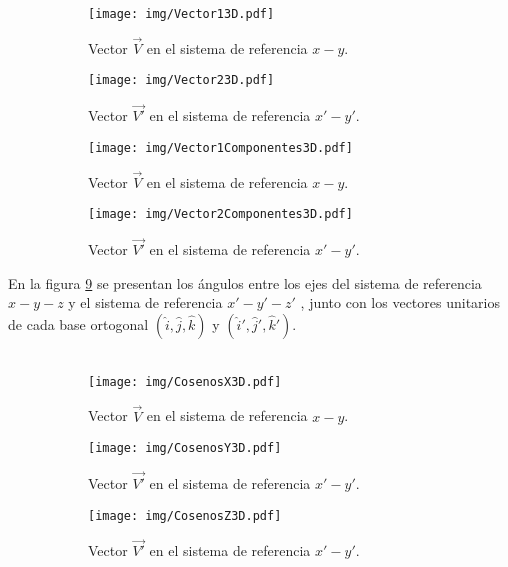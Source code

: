 \documentclass[12pt,letterpaper, twoside, openany]{article}
\begin{document}
\begin{figure}[H]
	\centering
	\begin{subfigure}[l]{0.450\textwidth}
		\texttt{[image: img/Vector13D.pdf]}
		\caption{Vector $\overset{\rightarrow}{V}$ en el sistema de referencia $x-y$.}
		\label{vector13d}
	\end{subfigure}
	\hspace{.5 cm}
	\begin{subfigure}[r]{0.450\textwidth}
		\texttt{[image: img/Vector23D.pdf]}
		\caption{Vector $\overset{\rightarrow}{V'}$ en el sistema de referencia $x'-y'$.}
		\label{vector23d}
	\end{subfigure}	
%
	\begin{subfigure}[l]{0.450\textwidth}
		\texttt{[image: img/Vector1Componentes3D.pdf]}
		\caption{Vector $\overset{\rightarrow}{V}$ en el sistema de referencia $x-y$.}
		\label{vector1comp3d}
	\end{subfigure}
	\hspace{.5 cm}
	\begin{subfigure}[r]{0.450\textwidth}
		\texttt{[image: img/Vector2Componentes3D.pdf]}
		\caption{Vector $\overset{\rightarrow}{V'}$ en el sistema de referencia $x'-y'$.}
		\label{vector2comp3d}
	\end{subfigure}	
	\caption{}
	\label{directores}
\end{figure}
%
%
%
%
%
En la figura \ref{directorestodos} se presentan los ángulos entre los ejes del sistema de referencia $x-y-z$ y el sistema de referencia $x'-y'-z'$ , junto con los vectores unitarios de cada base ortogonal $\left( \hat{i}, \hat{j}, \hat{k} \right)$ y $\left( \hat{i}', \hat{j}', \hat{k}' \right)$.\\\\

\begin{figure}[H]
	\centering
	\begin{subfigure}[l]{0.450\textwidth}
		\texttt{[image: img/CosenosX3D.pdf]}
		\caption{Vector $\overset{\rightarrow}{V}$ en el sistema de referencia $x-y$.}
		\label{cosx3d}
	\end{subfigure}
	\hspace{.5 cm}
	\begin{subfigure}[r]{0.450\textwidth}
		\texttt{[image: img/CosenosY3D.pdf]}
		\caption{Vector $\overset{\rightarrow}{V'}$ en el sistema de referencia $x'-y'$.}
		\label{cosy3d}
	\end{subfigure}
	\begin{subfigure}[r]{0.450\textwidth}
		\texttt{[image: img/CosenosZ3D.pdf]}
		\caption{Vector $\overset{\rightarrow}{V'}$ en el sistema de referencia $x'-y'$.}
		\label{cosz3d}
	\end{subfigure}	
	\caption{}
	\label{directorestodos}
\end{figure}
\end{document}
